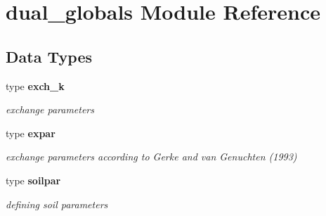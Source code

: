 \section{dual\+\_\+globals Module Reference}
\label{namespacedual__globals}
\subsection*{Data Types}
\begin{DoxyCompactItemize}
\item 
type {\bf exch\+\_\+k}
\begin{DoxyCompactList}\small\item\em exchange parameters \end{DoxyCompactList}\item 
type {\bf expar}
\begin{DoxyCompactList}\small\item\em exchange parameters according to Gerke and van Genuchten (1993) \end{DoxyCompactList}\item 
type {\bf soilpar}
\begin{DoxyCompactList}\small\item\em defining soil parameters \end{DoxyCompactList}\end{DoxyCompactItemize}
